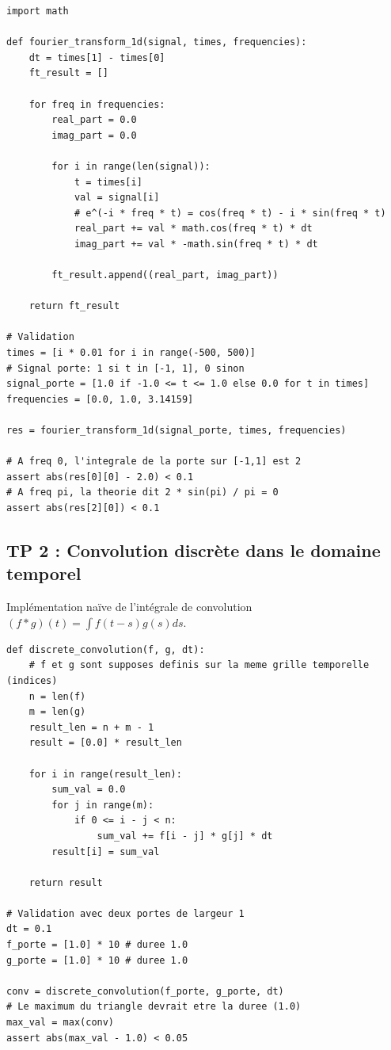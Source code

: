 \documentclass[11pt,a4paper]{article}
\begin{document}
\begin{lstlisting}
import math

def fourier_transform_1d(signal, times, frequencies):
    dt = times[1] - times[0]
    ft_result = []

    for freq in frequencies:
        real_part = 0.0
        imag_part = 0.0

        for i in range(len(signal)):
            t = times[i]
            val = signal[i]
            # e^(-i * freq * t) = cos(freq * t) - i * sin(freq * t)
            real_part += val * math.cos(freq * t) * dt
            imag_part += val * -math.sin(freq * t) * dt

        ft_result.append((real_part, imag_part))

    return ft_result

# Validation
times = [i * 0.01 for i in range(-500, 500)]
# Signal porte: 1 si t in [-1, 1], 0 sinon
signal_porte = [1.0 if -1.0 <= t <= 1.0 else 0.0 for t in times]
frequencies = [0.0, 1.0, 3.14159]

res = fourier_transform_1d(signal_porte, times, frequencies)

# A freq 0, l'integrale de la porte sur [-1,1] est 2
assert abs(res[0][0] - 2.0) < 0.1
# A freq pi, la theorie dit 2 * sin(pi) / pi = 0
assert abs(res[2][0]) < 0.1
\end{lstlisting}


\subsection*{TP 2 : Convolution discrète dans le domaine temporel}

Implémentation naïve de l'intégrale de convolution $(f * g)(t) = \int f(t-s)g(s)ds$.

\begin{lstlisting}
def discrete_convolution(f, g, dt):
    # f et g sont supposes definis sur la meme grille temporelle (indices)
    n = len(f)
    m = len(g)
    result_len = n + m - 1
    result = [0.0] * result_len

    for i in range(result_len):
        sum_val = 0.0
        for j in range(m):
            if 0 <= i - j < n:
                sum_val += f[i - j] * g[j] * dt
        result[i] = sum_val

    return result

# Validation avec deux portes de largeur 1
dt = 0.1
f_porte = [1.0] * 10 # duree 1.0
g_porte = [1.0] * 10 # duree 1.0

conv = discrete_convolution(f_porte, g_porte, dt)
# Le maximum du triangle devrait etre la duree (1.0)
max_val = max(conv)
assert abs(max_val - 1.0) < 0.05
\end{lstlisting}
\end{document}
